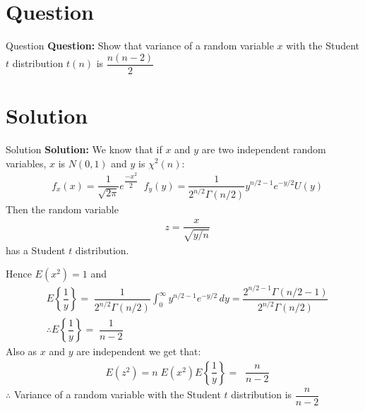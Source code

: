 \documentclass{beamer}
\begin{document}
       \section{Question}
       \begin{frame}{Question}
       \textbf{Question:} Show that variance of a random variable $x$ with the Student $t$ distribution $t(n)$ is $\dfrac{n(n-2)}{2}$
        \end{frame}
        \section{Solution}
        \begin{frame}{Solution}
       \textbf{Solution:} We know that if $x$ and $y$ are two independent random variables, $x$ is $N(0,1)$ and $y$ is $\chi^2(n)$:\\
       \begin{align}
       &f_x(x)=\dfrac{1}{\sqrt{2\pi}}e^{\dfrac{-x^2}{2}} \;\; f_y(y)=\dfrac{1}{2^{n/2}\Gamma(n/2)}y^{n/2-1}e^{-y/2}U(y)
       \end{align}
       Then the random variable
       \begin{align}
        &z=\dfrac{x}{\sqrt{y/n}}
       \end{align}
       has a Student $t$ distribution. 
        \end{frame}
        \begin{frame}
       Hence $E(x^2)=1$ and 
       \begin{align}
         &E\left\{\dfrac{1}{y}\right\}=\;\dfrac{1}{2^{n/2}\Gamma(n/2)}\int_{0}^{\infty}y^{n/2-1}e^{-y/2}  \,dy = \dfrac{2^{n/2-1}\Gamma(n/2-1)}{2^{n/2}\Gamma(n/2)}\\
         &\therefore E\left\{\dfrac{1}{y}\right\}=\; \dfrac{1}{n-2}
       \end{align}
       Also as $x$ and $y$ are independent we get that:
       \begin{align}
        &E(z^2)= n\;E(x^2)E\left\{\dfrac{1}{y}\right\}=\;\;\dfrac{n}{n-2}
       \end{align}
       $\therefore$ Variance of a random variable with the Student $t$ distribution is $\dfrac{n}{n-2}$ 
      \end{frame}
\end{document}
